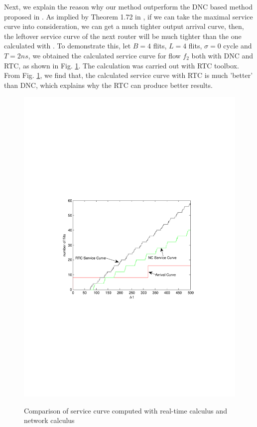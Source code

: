 \documentclass[10pt,journal]{IEEEtran}
\begin{document}
Next, we explain the reason why our method outperform the DNC based method proposed in \cite{Qian489900}. As implied by Theorem 1.72 in \cite{Boudec2001Network}, if we can take the maximal service curve into consideration, we can get a much tighter output arrival curve, then, the leftover service curve of the next router will be much tighter than the one calculated with \cite{qian2009analysis}. To demonstrate this, let $B=4$ flits, $L=4$ flits, $\sigma=0$ cycle and $T=2ns$, we obtained the calculated service curve for flow $f_2$ both with DNC and RTC, as shown in Fig. \ref{loose}. The calculation was carried out with RTC toolbox. From Fig. \ref{loose}, we find that, the calculated service curve with RTC is much 'better' than DNC, which explains why the RTC can produce better results.
\begin{figure}
  \centering
  \includegraphics[scale=0.6]{figures/loose.pdf}\\
  \caption{Comparison of service curve computed with real-time calculus and network calculus}\label{loose}
\end{figure}
\end{document}
